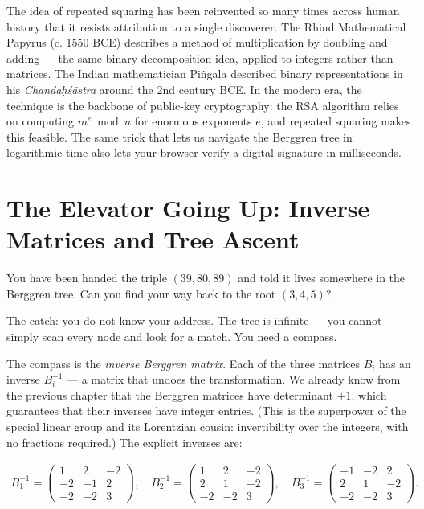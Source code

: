\documentclass[11pt,twoside,openright]{book}
\theoremstyle{definition}
\theoremstyle{remark}
\begin{document}
The idea of repeated squaring has been reinvented so many times across human history that it resists attribution to a single discoverer. The Rhind Mathematical Papyrus (c. 1550 BCE) describes a method of multiplication by doubling and adding --- the same binary decomposition idea, applied to integers rather than matrices. The Indian mathematician Piṅgala described binary representations in his \textit{Chandaḥśāstra} around the 2nd century BCE. In the modern era, the technique is the backbone of public-key cryptography: the RSA algorithm relies on computing $m^e \bmod n$ for enormous exponents $e$, and repeated squaring makes this feasible. The same trick that lets us navigate the Berggren tree in logarithmic time also lets your browser verify a digital signature in milliseconds.


\section{The Elevator Going Up: Inverse Matrices and Tree Ascent}

You have been handed the triple $(39, 80, 89)$ and told it lives somewhere in the Berggren tree. Can you find your way back to the root $(3, 4, 5)$?

The catch: you do not know your address. The tree is infinite --- you cannot simply scan every node and look for a match. You need a compass.

The compass is the \textit{inverse Berggren matrix}. Each of the three matrices $B_i$ has an inverse $B_i^{-1}$ --- a matrix that undoes the transformation. We already know from the previous chapter that the Berggren matrices have determinant $\pm 1$, which guarantees that their inverses have integer entries. (This is the superpower of the special linear group and its Lorentzian cousin: invertibility over the integers, with no fractions required.) The explicit inverses are:

\begin{align*}
B_1^{-1} = \begin{pmatrix} 1 & 2 & -2 \\ -2 & -1 & 2 \\ -2 & -2 & 3 \end{pmatrix}, \quad B_2^{-1} = \begin{pmatrix} 1 & 2 & -2 \\ 2 & 1 & -2 \\ -2 & -2 & 3 \end{pmatrix}, \quad B_3^{-1} = \begin{pmatrix} -1 & -2 & 2 \\ 2 & 1 & -2 \\ -2 & -2 & 3 \end{pmatrix}.
\end{align*}
\end{document}
